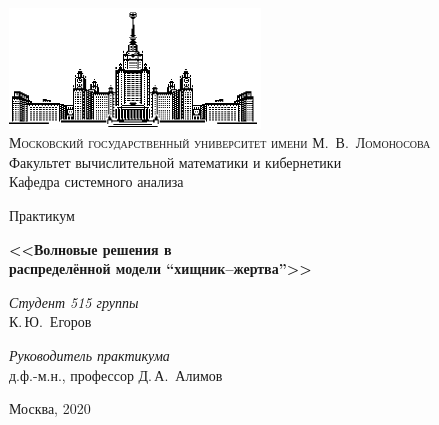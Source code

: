 \thispagestyle{empty}
\begin{center}
    \ \vspace{-3cm}

    \includegraphics[width=0.5\textwidth]{title_page/msu.eps}\\

    {\scshape Московский государственный университет имени М.~В.~Ломоносова}\\
    Факультет вычислительной математики и кибернетики\\
    Кафедра системного анализа

    \vfill

    {\LARGE Практикум}

    \vspace{1cm}
    {\Huge\bfseries <<Волновые решения в \\распределённой модели ``хищник--жертва''>>}
\end{center}

\vspace{3cm}

\begin{flushright}
    \large
    \textit{Студент 515 группы}\\
    К.\,Ю.~Егоров

    \vspace{5mm}

    \textit{Руководитель практикума}\\
    д.ф.-м.н., профессор Д.\,А.~Алимов
\end{flushright}

\vfill

\begin{center}
    Москва, 2020
\end{center}

\clearpage